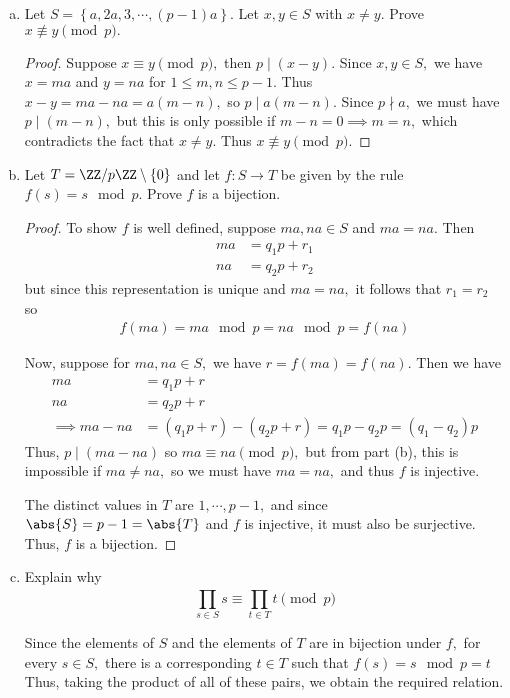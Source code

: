 \documentclass{article}
\begin{document}
\begin{itemize}
\begin{enumerate}[(a)]
			\item Let $S=\left\{ a, 2a, 3, \cdots, (p-1)a \right\}.$ Let $x, y\in S$ with $x\neq y.$ Prove $x\not\equiv y\pmod p.$
				\begin{proof}	
					Suppose $x\equiv y\pmod p,$ then $p\mid (x-y).$ Since $x, y\in S,$ we have $x=ma$ and $y=na$ for $1\le m, n\le p-1.$ Thus $x-y=ma-na=a(m-n),$ so $p\mid a(m-n).$ Since $p\nmid a,$ we must have $p\mid (m-n),$ but this is only possible if $m-n=0\implies m=n,$ which contradicts the fact that $x\neq y.$ Thus $x\not\equiv y\pmod p.$
				\end{proof}

			\item Let $T=\ZZ/p\ZZ\setminus\left\{ 0 \right\}$ and let $f:S\to T$ be given by the rule $f(s)=s\mod p.$ Prove $f$ is a bijection.
				\begin{proof}
					To show $f$ is well defined, suppose $ma, na\in S$ and $ma=na.$ Then
					\begin{align*}
						ma &=q_1p + r_1 \\
						na &= q_2p + r_2
					\end{align*}
					but since this representation is unique and $ma=na,$ it follows that $r_1=r_2$ so 
					\begin{align*}
						f(ma) = ma\mod p = na\mod p = f(na)
					\end{align*}

					Now, suppose for $ma, na\in S,$ we have $r=f(ma)=f(na).$ Then we have
					\begin{align*}
						ma &= q_1p + r \\
						na &= q_2p+r \\
						\implies ma-na &= (q_1p+r)-(q_2p+r) = q_1p-q_2p = (q_1-q_2)p
					\end{align*}
					Thus, $p\mid (ma-na)$ so $ma\equiv na\pmod p,$ but from part (b), this is impossible if $ma\neq na,$ so we must have $ma=na,$ and thus $f$ is injective.

					The distinct values in $T$ are $1, \cdots, p-1,$ and since $\abs{S}=p-1=\abs{T}$ and $f$ is injective, it must also be surjective. Thus, $f$ is a bijection.
				\end{proof}

			\item Explain why
				\[\prod_{s\in S}^{}s \equiv \prod_{t\in T}^{} t\pmod p\]
				\begin{answer*}
					Since the elements of $S$ and the elements of $T$ are in bijection under $f,$ for every $s\in S,$ there is a corresponding $t\in T$ such that $f(s)=s\mod p=t$ Thus, taking the product of all of these pairs, we obtain the required relation.
				\end{answer*}


\end{enumerate}
\end{itemize}
\end{document}
